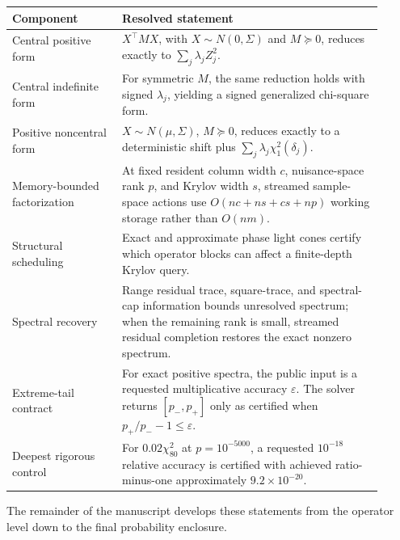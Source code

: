 \documentclass[11pt]{article}
\theoremstyle{definition}
\theoremstyle{remark}
\begin{document}
\begin{center}
\small
\begin{tabular}{@{}p{0.27\linewidth}p{0.64\linewidth}@{}}
\toprule
Component & Resolved statement\\
\midrule
Central positive form &
\(X^\top M X\), with \(X\sim N(0,\Sigma)\) and \(M\succeq0\), reduces
exactly to \(\sum_j\lambda_j Z_j^2\).\\[2mm]

Central indefinite form &
For symmetric \(M\), the same reduction holds with signed
\(\lambda_j\), yielding a signed generalized chi-square form.\\[2mm]

Positive noncentral form &
\(X\sim N(\mu,\Sigma)\), \(M\succeq0\), reduces exactly to a deterministic
shift plus \(\sum_j\lambda_j\chi^2_1(\delta_j)\).\\[2mm]

Memory-bounded factorization &
At fixed resident column width \(c\), nuisance-space rank \(p\), and Krylov
width \(s\), streamed sample-space actions use
\(O(nc+ns+cs+np)\) working storage rather than \(O(nm)\).\\[2mm]

Structural scheduling &
Exact and approximate phase light cones certify which operator blocks can
affect a finite-depth Krylov query.\\[2mm]

Spectral recovery &
Range residual trace, square-trace, and spectral-cap information bounds
unresolved spectrum; when the remaining rank is small, streamed residual
completion restores the exact nonzero spectrum.\\[2mm]

Extreme-tail contract &
For exact positive spectra, the public input is a requested multiplicative
accuracy \(\varepsilon\).  The solver returns
\([p_-,p_+]\) only as certified when
\(p_+/p_- - 1\le\varepsilon\).\\[2mm]

Deepest rigorous control &
For \(0.02\chi^2_{80}\) at \(p=10^{-5000}\), a requested
\(10^{-18}\) relative accuracy is certified with achieved
ratio-minus-one approximately \(9.2\times10^{-20}\).\\
\bottomrule
\end{tabular}
\end{center}

The remainder of the manuscript develops these statements from the operator
level down to the final probability enclosure.
\end{document}

